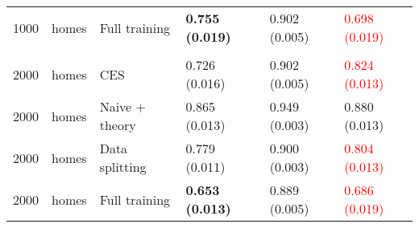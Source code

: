 \begin{tabular}[t]{rlllll}
\hspace{1em}1000 & homes & Full training & \textbf{0.755 (0.019)} & 0.902 (0.005) & \textcolor{red}{0.698 (0.019)}\\
\addlinespace[0.3em]
\multicolumn{6}{l}{\textbf{2000}}\\
\hspace{1em}2000 & homes & CES & 0.726 (0.016) & 0.902 (0.005) & \textcolor{red}{0.824 (0.013)}\\
\hspace{1em}2000 & homes & Naive + theory & 0.865 (0.013) & 0.949 (0.003) & 0.880 (0.013)\\
\hspace{1em}2000 & homes & Data splitting & 0.779 (0.011) & 0.900 (0.003) & \textcolor{red}{0.804 (0.013)}\\
\hspace{1em}2000 & homes & Full training & \textbf{0.653 (0.013)} & 0.889 (0.005) & \textcolor{red}{0.686 (0.019)}\\
\bottomrule
\end{tabular}

